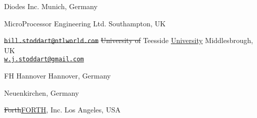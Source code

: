 	{}
	{Diodes Inc.}
	{Munich, Germany}

	{}
	{MicroProcessor Engineering Ltd.}
	{Southampton, UK}

\cbstart
{}
	{\sout{\texttt{bill.stoddart@ntlworld.com}}}
	{\sout{University of} Teesside \uline{University}}
	{Middlesbrough, UK}\\
\uline{\texttt{w.j.stoddart@gmail.com}}
\cbend

	{}
	{FH Hannover}
	{Hannover, Germany}

	{}
	{}
	{Neuenkirchen, Germany}

\cbstart
{}
	{}
	{\sout{Forth}\uline{FORTH}, Inc.}
	{Los Angeles, USA}
\cbend
